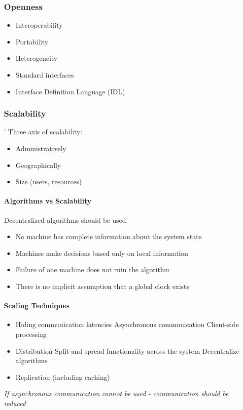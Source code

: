 \subsubsection{Openness}
\begin{itemize}
	\item Interoperability
	\item Portability
	\item Heterogeneity
	\item Standard interfaces
	\item Interface Definition Language (IDL)
\end{itemize}

\subsubsection{Scalability}'
Three axis of scalability:
\begin{itemize}
	\item Administratively
	\item Geographically
	\item Size (users, resources)
\end{itemize}

\paragraph{Algorithms vs Scalability}
Decentralized algorithms should be used:
\begin{itemize}
	\item No machine has complete information about the system state
	\item Machines make decisions based only on local information
	\item Failure of one machine does not ruin the algorithm
	\item There is no implicit assumption that a global clock exists
\end{itemize}

\paragraph{Scaling Techniques}
\begin{itemize}
	\item Hiding communication latencies
	\subitem Asynchronous communication
	\subitem Client-side processing
	\item Distribution
	\subitem Split and spread functionality across the system
	\subitem Decentralize algorithms
	\item Replication (including caching)
\end{itemize}
\textit{If asynchronous communication cannot be used - communication should be reduced}

